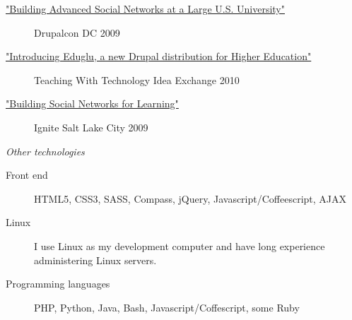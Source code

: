 \documentclass[11pt]{article}
\begin{document}
\begin{description}
  \item[\href{http://www.archive.org/details/DrupalconDc2009-BuildingAdvancedSocialNetworksAtALargeU.s.University}{"Building Advanced Social Networks at a Large U.S. University"}] Drupalcon DC 2009
  \item[\href{http://ttix.org/archives/2010-sessions/introducing-eduglu-a-new-drupal-distribution-for-higher-education/}{"Introducing Eduglu, a new Drupal distribution for Higher Education"}] Teaching With Technology Idea Exchange 2010
  \item[\href{http://www.ignitesaltlake.com/ignite/index.cfm/videos/ignite-salt-lake-2/}{"Building Social Networks for Learning"}] Ignite Salt Lake City 2009
\end{description}

\bigskip

\noindent\emph{Other technologies}

\begin{description}
  \item[Front end] HTML5, CSS3, SASS, Compass, jQuery, Javascript/Coffeescript, AJAX
  \item[Linux] I use Linux as my development computer and have long experience administering Linux servers.
  \item[Programming languages] PHP, Python, Java, Bash, Javascript/Coffescript, some Ruby
\end{description}
\end{document}
